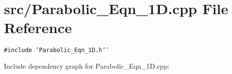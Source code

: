 \section{src/Parabolic\_\-Eqn\_\-1D.cpp File Reference}
\label{Parabolic__Eqn__1D_8cpp}
{\tt \#include \char`\"{}Parabolic\_\-Eqn\_\-1D.h\char`\"{}}\par


Include dependency graph for Parabolic\_\-Eqn\_\-1D.cpp: